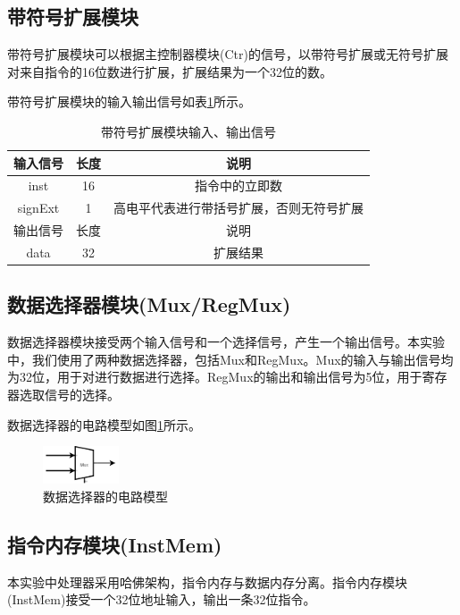 \documentclass[UTF8]{ctexart}
\begin{document}
\subsection{带符号扩展模块}
    带符号扩展模块可以根据主控制器模块(Ctr)的信号，以带符号扩展或无符号扩展对来自指令的16位数进行扩展，扩展结果为一个32位的数。\par
    带符号扩展模块的输入输出信号如表\ref{tab:signext-input-output-sig}所示。
    \begin{table}[htbp]
        \centering
        \begin{tabular}{|c|c|c|}
        \hline
        输入信号 & 长度 & 说明 \\ 
        \hline
        inst & 16 & 指令中的立即数 \\
        signExt & 1 & 高电平代表进行带括号扩展，否则无符号扩展 \\
        \hline
        \hline
        输出信号 & 长度 & 说明 \\ 
        \hline
        data & 32 & 扩展结果\\
        \hline
        \end{tabular}
        \caption{带符号扩展模块输入、输出信号}
        \label{tab:signext-input-output-sig}
        \end{table}
    
\subsection{数据选择器模块(Mux/RegMux)}
    数据选择器模块接受两个输入信号和一个选择信号，产生一个输出信号。本实验中，我们使用了两种数据选择器，包括Mux和RegMux。Mux的输入与输出信号均为32位，用于对进行数据进行选择。RegMux的输出和输出信号为5位，用于寄存器选取信号的选择。\par
    数据选择器的电路模型如图\ref{fig:mux}所示。\par
    \begin{figure}[H]
        \centering
        \includegraphics[width=0.2\textwidth]{fig-mux.png}
        \caption{数据选择器的电路模型}
        \label{fig:mux}
    \end{figure}

\subsection{指令内存模块(InstMem)}
    本实验中处理器采用哈佛架构，指令内存与数据内存分离。指令内存模块(InstMem)接受一个32位地址输入，输出一条32位指令。
\end{document}
